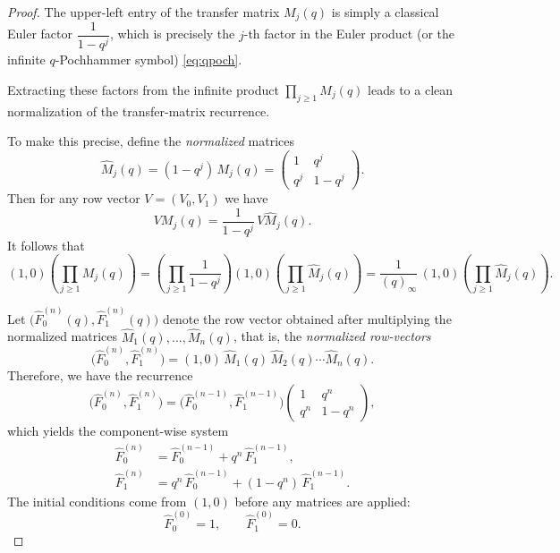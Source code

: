 \documentclass[10pt,a4paper]{amsart}
\begin{document}
\begin{proof}


 

The upper-left entry of the transfer matrix $M_j(q)$ is simply a   classical Euler factor $\dfrac{1}{1-q^j}$, which is precisely the \(j\)-th factor in the Euler product (or the infinite $q$-Pochhammer symbol) \eqref{eq:qpoch}.


Extracting these factors from the infinite product
\(\prod_{j\ge1} M_j(q)\) leads to a clean normalization of the transfer-matrix
recurrence.



 
To make this precise, define the \emph{normalized} matrices
\begin{equation}\label{eq:NormlizedMatrix}
    \widehat{M}_j(q)
 = 
(1-q^j)\, M_j(q)
=
\begin{pmatrix}
1 & q^j \\[4pt]
q^j & 1-q^j
\end{pmatrix}.
\end{equation}
Then for any row vector \(V=(V_0,V_1)\) we have
\[
V M_j(q)
=
\frac{1}{1-q^j}\, V \widehat{M}_j(q).
\]
It follows that
\[
(1,0)\!\left(\prod_{j\ge1} M_j(q)\right)
=
\left(\prod_{j\ge1} \frac{1}{1-q^j}\right)
(1,0)\!\left(\prod_{j\ge1} \widehat{M}_j(q)\right)
=
\frac{1}{(q)_\infty}\,
(1,0)\!\left(\prod_{j\ge1} \widehat{M}_j(q)\right).
\]



 
Let \(\bigl(\widehat{F}_0^{(n)}(q),\widehat{F}_1^{(n)}(q)\bigr)\) denote the row vector
obtained after multiplying the normalized matrices \(\widehat{M}_1(q),\ldots,\widehat{M}_n(q)\), that is, the \emph{normalized row-vectors} 
\begin{equation}\label{eq:NormlizedVector}
    \bigl(\widehat{F}_0^{(n)},\widehat{F}_1^{(n)}\bigr)
=
(1,0) \,\widehat{M}_1(q)\,\widehat{M}_2(q)\cdots\widehat{M}_n(q).
\end{equation}
Therefore, we have the recurrence
\begin{equation}
    \bigl(\widehat{F}_0^{(n)},\widehat{F}_1^{(n)}\bigr)
=
\bigl(\widehat{F}_0^{(n-1)},\widehat{F}_1^{(n-1)}\bigr)
\begin{pmatrix}
1 & q^n \\[4pt]
q^n & 1-q^n
\end{pmatrix},
\end{equation}
which yields the component-wise system
\begin{align*}
\widehat{F}_0^{(n)}
&=
\widehat{F}_0^{(n-1)} + q^n\,\widehat{F}_1^{(n-1)},\\[4pt]
\widehat{F}_1^{(n)}
&=
q^n\,\widehat{F}_0^{(n-1)} + (1-q^n)\,\widehat{F}_1^{(n-1)}.
\end{align*}
The initial conditions come from \((1,0)\) before any matrices are applied:
\[
\widehat{F}_0^{(0)} = 1,\qquad
\widehat{F}_1^{(0)} = 0.
\]




\end{proof}
\end{document}
